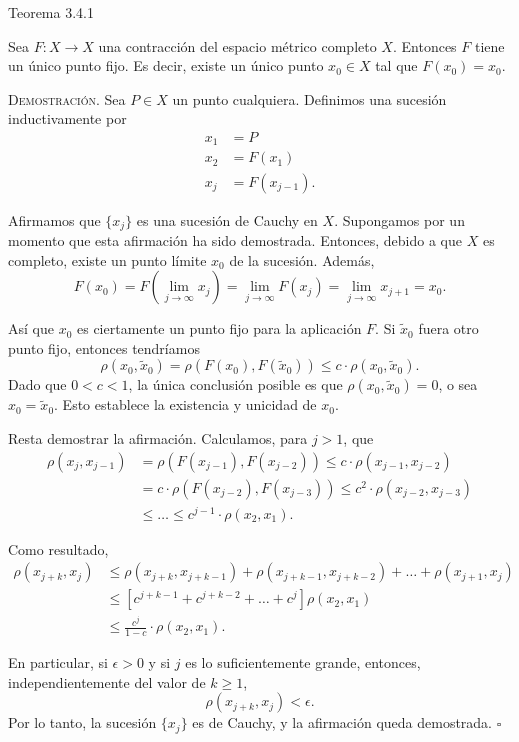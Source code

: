\documentclass[10pt]{beamer}
\begin{document}
	\begin{frame}[allowframebreaks]{Teorema 3.4.1}
		\begin{theorem}
			Sea $F : X \to X$ una contracción del espacio métrico completo $X$. Entonces $F$ tiene un único punto fijo. Es decir, existe un único punto $x_0 \in X$ tal que $F(x_0) = x_0$.
		\end{theorem}
		
		\textsc{Demostración.} Sea $P \in X$ un punto cualquiera. Definimos una sucesión inductivamente por
		\begin{align*}
			x_1 &= P \\
			x_2 &= F(x_1) \\
			x_j &= F(x_{j-1}).
		\end{align*}
		
		Afirmamos que $\{x_j\}$ es una sucesión de Cauchy en $X$. Supongamos por un momento que esta afirmación ha sido demostrada. Entonces, debido a que $X$ es completo, existe un punto límite $x_0$ de la sucesión. Además,
		\[ F(x_0) = F\left(\lim_{j \to \infty} x_j\right) = \lim_{j \to \infty} F(x_j) = \lim_{j \to \infty} x_{j+1} = x_0. \]
		
		\framebreak
		
		Así que $x_0$ es ciertamente un punto fijo para la aplicación $F$. Si $\tilde{x}_0$ fuera otro punto fijo, entonces tendríamos
		\[ \rho(x_0, \tilde{x}_0) = \rho(F(x_0), F(\tilde{x}_0)) \leq c \cdot \rho(x_0, \tilde{x}_0). \]
		Dado que $0 < c < 1$, la única conclusión posible es que $\rho(x_0, \tilde{x}_0) = 0$, o sea $x_0 = \tilde{x}_0$. Esto establece la existencia y unicidad de $x_0$. 
		
		Resta demostrar la afirmación. Calculamos, para $j > 1$, que
		\begin{align*}
			\rho(x_j, x_{j-1}) &= \rho(F(x_{j-1}), F(x_{j-2})) \leq c \cdot \rho(x_{j-1}, x_{j-2}) \\
			&= c \cdot \rho(F(x_{j-2}), F(x_{j-3})) \leq c^2 \cdot \rho(x_{j-2}, x_{j-3}) \\
			&\leq \dots \leq c^{j-1} \cdot \rho(x_2, x_1).
		\end{align*}
		
		\framebreak
		
		Como resultado,
		\begin{align*}
			\rho(x_{j+k}, x_j) &\leq \rho(x_{j+k}, x_{j+k-1}) + \rho(x_{j+k-1}, x_{j+k-2}) + \dots + \rho(x_{j+1}, x_j) \\
			&\leq \left[c^{j+k-1} + c^{j+k-2} + \dots + c^j\right] \rho(x_2, x_1) \\
			&\leq \frac{c^j}{1 - c} \cdot \rho(x_2, x_1).
		\end{align*}
		
		En particular, si $\epsilon > 0$ y si $j$ es lo suficientemente grande, entonces, independientemente del valor de $k \geq 1$,
		\[ \rho(x_{j+k}, x_j) < \epsilon. \]
		Por lo tanto, la sucesión $\{x_j\}$ es de Cauchy, y la afirmación queda demostrada. \hfill $\square$
	\end{frame}
	
\end{document}
